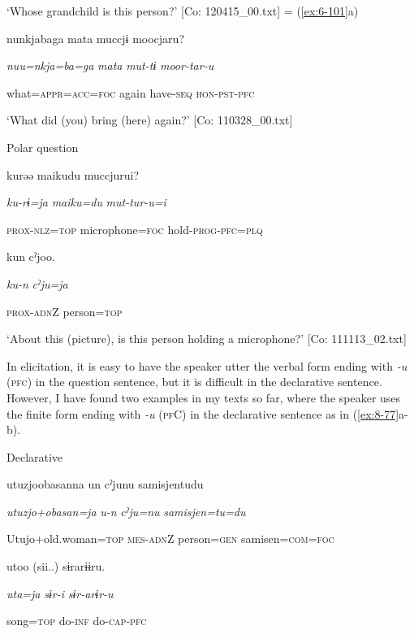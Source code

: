 \glt ‘Whose grandchild is this person?’ [Co: 120415\_00.txt]
 = (\ref{ex:6-101}a)

    {\TM}
\glll  nunkjabaga  mata  muccjɨ  moocjaru?

      \textit{nuu=nkja=ba=ga}  \textit{mata}  \textit{mut-tɨ}  \textit{moor-tar-u}

      what=\textsc{appr}=\textsc{acc}=\textsc{foc}  again  have-\textsc{seq}  \textsc{hon}-\textsc{pst}-\textsc{pfc}

\glt ‘What did (you) bring (here) again?’ [Co: 110328\_00.txt]
\z

  Polar question

\ex {\TM}
\glll  kurəə  {\textbar}maiku{\textbar}du  muccjurui?

      \textit{ku-rɨ=ja}  \textit{maiku=du}  \textit{mut-tur-u=i}

      \textsc{prox}-\textsc{nlz}=\textsc{top}  microphone=\textsc{foc}  hold-\textsc{prog}-\textsc{pfc}=\textsc{plq}

      kun  cˀjoo.  

      \textit{ku-n}  \textit{cˀju=ja}  

      \textsc{prox}-\textsc{adn}Z  person=\textsc{top}

\glt ‘About this (picture), is this person holding a microphone?’ [Co: 111113\_02.txt]
\z

In elicitation, it is easy to have the speaker utter the verbal form ending with \textit{{}-u} (\textsc{pfc}) in the question sentence, but it is difficult in the declarative sentence. However, I have found two examples in my texts so far, where the speaker uses the finite form ending with \textit{{}-u} (\textsc{pf}C) in the declarative sentence as in (\ref{ex:8-77}a-b).

\ea\label{ex:8-77}
  Declarative

\ea {\TM}
\glll  utuzjoobasanna  un  cˀjunu  samisjentudu

      \textit{utuzjo+obasan=ja}  \textit{u-n}  \textit{cˀju=nu}  \textit{samisjen=tu=du}

      Utujo+old.woman=\textsc{top}  \textsc{mes}-\textsc{adn}Z  person=\textsc{gen}  samisen=\textsc{com}=\textsc{foc}

      utoo  (sii..)  sɨrarɨɨru.  

      \textit{uta=ja}  \textit{sɨr-i}  \textit{sɨr-arɨr-u}  

      song=\textsc{top}  do-\textsc{inf}  do-\textsc{cap}-\textsc{pfc}

